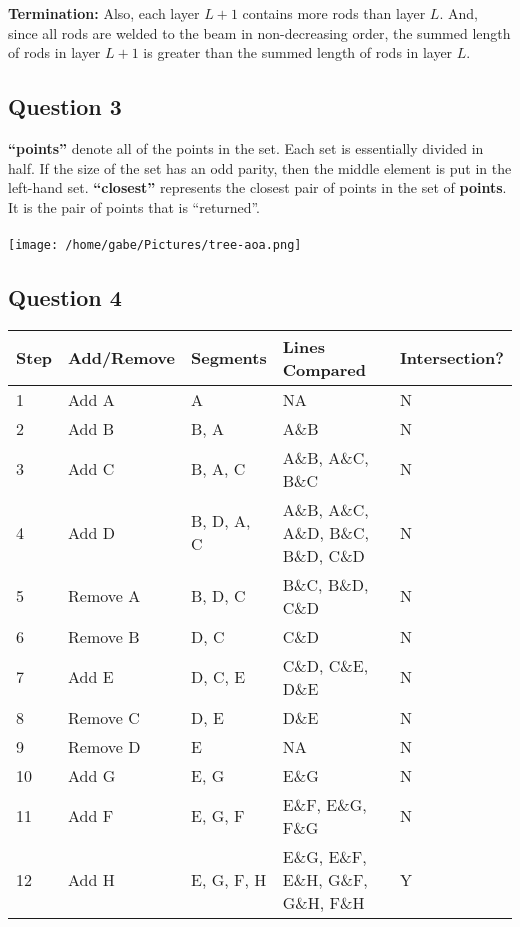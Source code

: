 \documentclass[12pt]{article}
\begin{document}
\noindent \textbf{Termination: }  Also, each layer $L+1$ contains more rods than layer $L$. 
And, since all rods are welded to the beam in non-decreasing order, the summed length of rods
in layer $L+1$ is greater than the summed length of rods in layer $L$.

\newpage
\subsection*{Question 3}
\textbf{``points''} denote all of the points in the set. Each set
is essentially divided in half. If the size of the set has an odd parity, then the 
middle element is put in the left-hand set. \textbf{``closest''} represents the closest
pair of points in the set of \textbf{points}. It is the pair of points that is 
``returned''. \\ \\

\texttt{[image: /home/gabe/Pictures/tree-aoa.png]}

\subsection*{Question 4}
\begin{center}
  \begin{tabular}{ | l | l | l | l | l | }
    \hline
    Step & Add/Remove & Segments   & Lines Compared & Intersection? \\ \hline
    1    & Add A       & A          & NA    & N \\ \hline
		2    & Add B       & B, A       & A\&B    & N \\ \hline
		3    & Add C       & B, A, C    & A\&B, A\&C, B\&C & N \\ \hline
		4    & Add D       & B, D, A, C & A\&B, A\&C, A\&D, B\&C, B\&D, C\&D & N \\ \hline
		5    & Remove A    & B, D, C    & B\&C, B\&D, C\&D & N \\ \hline
		6    & Remove B    & D, C       & C\&D     & N \\ \hline
		7    & Add E       & D, C, E    & C\&D, C\&E, D\&E     & N \\ \hline
		8    & Remove C    & D, E       & D\&E     & N \\ \hline
    9    & Remove D    & E          & NA     & N \\ \hline
		10   & Add G			 & E, G       & E\&G     & N \\ \hline
		11   & Add F			 & E, G, F    & E\&F, E\&G, F\&G     & N \\ \hline
		12   & Add H	  	 & E, G, F, H & E\&G, E\&F, E\&H, G\&F, G\&H, F\&H & Y \\ \hline
  \end{tabular}
\end{center}
\end{document}
